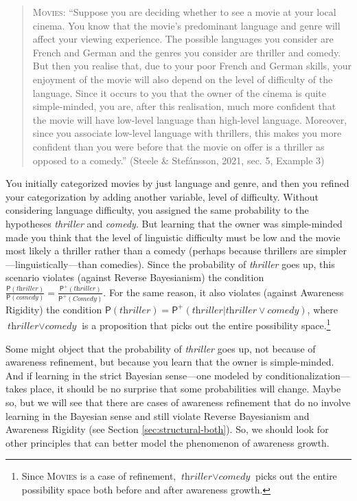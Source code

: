\documentclass[
  11pt,
  dvipsnames,enabledeprecatedfontcommands, todos]{scrartcl}
\newcommand{\pr}[1]{\ensuremath{\mathsf{P}(#1)}}
\newcommand{\ppr}[2]{\ensuremath{\mathsf{P}^{#1}(#2)}}
\begin{document}
\begin{quote}
\textsc{Movies}: ``Suppose you are deciding whether to see a movie at
your local cinema. You know that the movie's predominant language and
genre will affect your viewing experience. The possible languages you
consider are French and German and the genres you consider are thriller
and comedy. But then you realise that, due to your poor French and
German skills, your enjoyment of the movie will also depend on the level
of difficulty of the language. Since it occurs to you that the owner of
the cinema is quite simple-minded, you are, after this realisation, much
more confident that the movie will have low-level language than
high-level language. Moreover, since you associate low-level language
with thrillers, this makes you more confident than you were before that
the movie on offer is a thriller as opposed to a comedy.'' (Steele \&
Stefánsson, 2021, sec. 5, Example 3)
\end{quote}

\doublespace

\noindent You initially categorized movies by just language and genre,
and then you refined your categorization by adding another variable,
level of difficulty. Without considering language difficulty, you
assigned the same probability to the hypotheses \textit{thriller} and
\textit{comedy}. But learning that the owner was simple-minded made you
think that the level of linguistic difficulty must be low and the movie
most likely a thriller rather than a comedy (perhaps because thrillers
are simpler---linguistically---than comedies). Since the probability of
\textit{thriller} goes up, this scenario violates (against Reverse
Bayesianism) the condition
\(\frac{\pr{\textit{thriller}}}{\pr{\textit{comedy}}}=\frac{\ppr{+}{\textit{thriller}}}{\ppr{+}{\textit{Comedy}}}\).
For the same reason, it also violates (against Awareness Rigidity) the
condition
\(\pr{\textit{thriller}}=\ppr{+}{\textit{thriller} \vert \textit{thriller}\vee \textit{comedy}}\),
where \(\textit{thriller}\vee \textit{comedy}\) is a proposition that
picks out the entire possibility space.\footnote{Since \textsc{Movies}
  is a case of refinement, \(\textit{thriller}\vee \textit{comedy}\)
  picks out the entire possibility space both before and after awareness
  growth.}

Some might object that the probability of \textit{thriller} goes up, not
because of awareness refinement, but because you learn that the owner is
simple-minded. And if learning in the strict Bayesian sense---one
modeled by conditionalization---takes place, it should be no surprise
that some probabilities will change. Maybe so, but we will see that
there are cases of awareness refinement that do no involve learning in
the Bayesian sense and still violate Reverse Bayesianism and Awareness
Rigidity (see Section \ref{sec:structural-both}). So, we should look for
other principles that can better model the phenomenon of awareness
growth.
\end{document}
